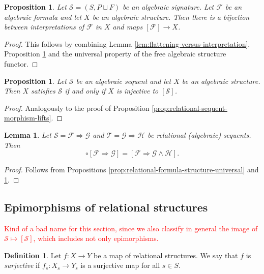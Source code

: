 \documentclass[a4paper]{article}
\newcommand{\todo}[1]{\textcolor{red}{#1}}
\newtheorem{lemma}[theorem]{Lemma}
\newtheorem{proposition}[theorem]{Proposition}
\theoremstyle{remark}
\theoremstyle{definition}
\newtheorem{definition}[theorem]{Definition}
\begin{document}
\begin{proposition}
  \label{prop:algebraic-formula-structure-universal}
  Let $\mathcal{S} = (S, P \sqcup F)$ be an algebraic signature.
  Let $\mathcal{F}$ be an algebraic formula and let $X$ be an algebraic structure.
  Then there is a bijection between interpretations of $\mathcal{F}$ in $X$ and maps $[\mathcal{F}] \rightarrow X$.
\end{proposition}
\begin{proof}
  This follows by combining Lemma \ref{lem:flattening-versus-interpretation}, Proposition \ref{prop:algebraic-formula-structure-universal} and the universal property of the free algebraic structure functor.
\end{proof}

\begin{proposition}
  Let $\mathcal{S}$ be an algebraic sequent and let $X$ be an algebraic structure.
  Then $X$ satisfies $\mathcal{S}$ if and only if $X$ is injective to $[\mathcal{S}]$.
\end{proposition}
\begin{proof}
  Analogously to the proof of Proposition \ref{prop:relational-sequent-morphism-lifts}.
\end{proof}

\begin{lemma}
  \label{lem:composition-sequent-morphisms}
  Let $\mathcal{S} = \mathcal{F} \Rightarrow \mathcal{G}$ and $\mathcal{T} = \mathcal{G} \Rightarrow \mathcal{H}$ be relational (algebraic) sequents.
  Then
  \begin{equation}
    [\mathcal{F} \land \mathcal{G} \Rightarrow \mathcal{H}] \circ [\mathcal{F} \Rightarrow \mathcal{G}] = [\mathcal{F} \Rightarrow \mathcal{G} \land \mathcal{H}].
  \end{equation}
\end{lemma}
\begin{proof}
  Follows from Propositions \ref{prop:relational-formula-structure-universal} and \ref{prop:algebraic-formula-structure-universal}.
\end{proof}

\subsection{Epimorphisms of relational structures}
\todo{
  Kind of a bad name for this section, since we also classify in general the image of $\mathcal{S} \mapsto [\mathcal{S}]$, which includes not only epimorphisms.
}

\begin{definition}
  Let $f : X \rightarrow Y$ be a map of relational structures.
  We say that $f$ is \emph{surjective} if $f_s: X_s \rightarrow Y_s$ is a surjective map for all $s \in S$.
\end{definition}
\end{document}
